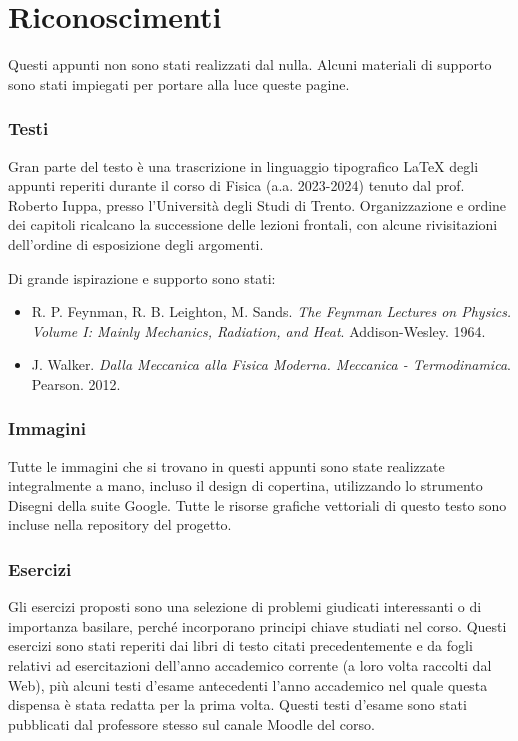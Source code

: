 \section*{Riconoscimenti}
Questi appunti non sono stati realizzati dal nulla.
Alcuni materiali di supporto sono stati impiegati
per portare alla luce queste pagine.

\subsubsection*{Testi}
Gran parte del testo è una trascrizione in linguaggio tipografico \LaTeX\@
degli appunti reperiti durante
il corso di Fisica (a.a. 2023-2024) tenuto dal prof. Roberto Iuppa, presso
l'Università degli Studi di Trento. Organizzazione e ordine dei
capitoli ricalcano la successione delle lezioni frontali, con alcune
rivisitazioni dell'ordine di esposizione degli argomenti.

Di grande ispirazione e supporto sono stati:
\begin{itemize}
    \item R. P. Feynman, R. B. Leighton, M. Sands. \textit{The Feynman Lectures on Physics. Volume I: Mainly Mechanics, Radiation, and Heat}. Addison-Wesley. 1964.
    \item J. Walker. \textit{Dalla Meccanica alla Fisica Moderna. Meccanica - Termodinamica}. Pearson. 2012.
\end{itemize}

\subsubsection*{Immagini}
Tutte le immagini che si trovano in questi appunti sono state realizzate
integralmente a mano, incluso il design di copertina, utilizzando
lo strumento Disegni della suite Google. Tutte le risorse
grafiche vettoriali di questo testo sono incluse nella repository del progetto.

\subsubsection*{Esercizi}
Gli esercizi proposti sono una selezione di problemi
giudicati interessanti o
di importanza basilare, perché incorporano principi chiave studiati nel corso.
Questi esercizi sono stati reperiti dai libri di testo citati precedentemente
e da fogli relativi ad esercitazioni dell'anno accademico corrente (a loro
volta raccolti dal Web), più alcuni testi d'esame antecedenti l'anno accademico
nel quale questa dispensa è stata redatta per la prima volta. Questi testi
d'esame sono stati pubblicati dal professore stesso sul canale Moodle del corso.